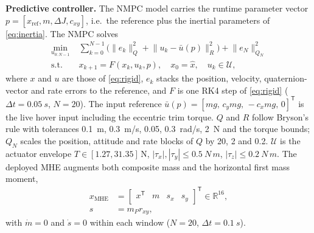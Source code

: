 \documentclass[conference]{IEEEtran}
\begin{document}
\textbf{Predictive controller.} The NMPC model carries the runtime parameter vector
$p = [x_{\text{ref}}, m, \Delta J, c_{xy}]$, i.e.\ the reference plus the inertial parameters of
\eqref{eq:inertia}. The NMPC solves
\begin{equation}
\begin{aligned}
\min_{u_{0:N-1}}\;& \textstyle\sum_{k=0}^{N-1}\bigl(\lVert e_k\rVert_{Q}^2
  +\lVert u_k-\bar u(p)\rVert_{R}^2\bigr)+\lVert e_N\rVert_{Q_N}^2\\
\text{s.t.}\;& x_{k+1}=F(x_k,u_k,p),\quad x_0=\hat x,\quad u_k\in\mathcal U,
\end{aligned}
\label{eq:nmpc}
\end{equation}
where $x$ and $u$ are those of \eqref{eq:rigid}, $e_k$ stacks the position, velocity, quaternion-vector and
rate errors to the reference, and $F$ is one RK4 step of \eqref{eq:rigid}
($\Delta t=\SI{0.05}{s}$, $N=20$). The
input reference $\bar u(p)=[mg,\,c_y mg,\,-c_x mg,\,0]^{\mathsf T}$ is the live hover input
including the eccentric trim torque. $Q$ and $R$ follow Bryson's rule with tolerances
\SI{0.1}{m}, \SI{0.3}{m/s}, 0.05, \SI{0.3}{rad/s}, \SI{2}{N} and the torque bounds; $Q_N$
scales the position, attitude and rate blocks of $Q$ by 20, 2 and 0.2. $\mathcal U$ is the
actuator envelope $T\in[1.27,31.35]$\,N, $|\tau_x|,|\tau_y|\le\SI{0.5}{N\,m}$,
$|\tau_z|\le\SI{0.2}{N\,m}$. The deployed MHE augments both composite mass and
the horizontal first mass moment,
\begin{equation}
\begin{aligned}
x_{\mathrm{MHE}} &= \begin{bmatrix}x^{\mathsf T} & m & s_x & s_y\end{bmatrix}^{\mathsf T}
                   \in\mathbb{R}^{16},\\
s &= m_P r_{xy},
\end{aligned}
\label{eq:mhe-state}
\end{equation}
with $\dot m=0$ and $\dot s=0$ within each window ($N=20$, $\Delta t=\SI{0.1}{s}$).
\end{document}
